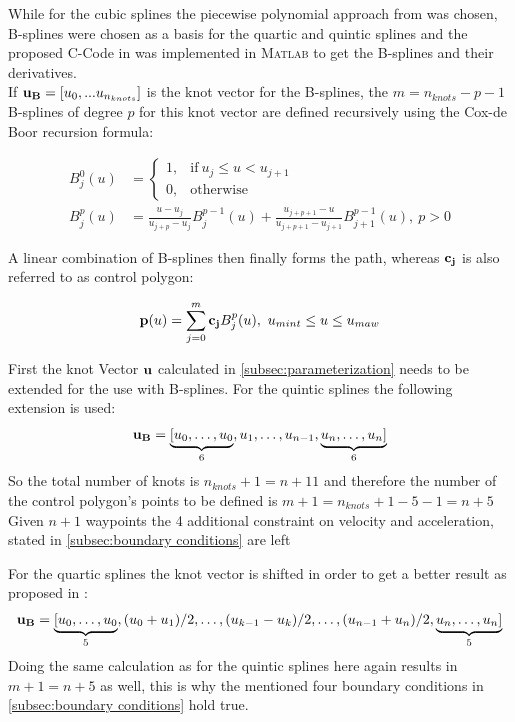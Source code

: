 While for the cubic splines the piecewise polynomial approach from \cite{engeln} was chosen, B-splines were chosen as a basis for the quartic and quintic splines and the proposed C-Code in \cite{biagiotti} was implemented in \textsc{Matlab} to get the B-splines and their derivatives.\\

If ${\bf u_B}=\left[u_0,...u_{n_{knots}}\right]$ is the knot vector for the B-splines, the $m=n_{knots}-p-1$ B-splines of degree $p$ for this knot vector are defined recursively using the Cox-de Boor recursion formula:

\begin{align}
B_j^0(u) &= \begin{cases} 1,&\text{if}~ u_j \leq u < u_{j+1}\\
					0,&\text{otherwise}
		\end{cases}\\
B_j^p(u) &= \frac{u-u_j}{u_{j+p}-u_j}B_j^{p-1}(u)+\frac{u_{j+p+1}-u}{u_{j+p+1}-u_{j+1}}B_{j+1}^{p-1}(u), ~p>0
\end{align}

A linear combination of B-splines then finally forms the path, whereas ${\bf c_j}$ is also referred to as control polygon:

\begin{equation}
{\bf p}(u) = \sum_{j=0}^m {\bf c_j}B_j^p(u), ~u_{mint} \leq u \leq u_{maw}
\end{equation}
 
First the knot Vector ${\bf u}$ calculated in \ref{subsec:parameterization} needs to be extended for the use with B-splines. For the quintic splines the following extension is used:
\begin{equation}
{\bf u_B}= \underbrace{ [u_0,\ldots,u_0}_{6},u_1, \ldots,u_{n-1},\underbrace{u_n,\ldots, u_n ]}_{6} 
\end{equation}
So the total number of knots is $n_{knots}+1 = n+11$ and therefore the number of the control polygon's points to be defined is $m+1=n_{knots}+1-5-1=n+5$ Given $n+1$ waypoints the 4 additional constraint on velocity and acceleration, stated in \ref{subsec:boundary conditions} are left

For the quartic splines the knot vector is shifted in order to get a better result as proposed in \cite{engeln}:
\begin{equation}
{\bf u_B}= \underbrace{ [u_0,\ldots,u_0}_{5},(u_0+u_1)/2, \ldots, (u_{k-1}-u_k)/2, \ldots,(u_{n-1}+u_n)/2,\underbrace{u_n,\ldots, u_n ]}_{5} 
\end{equation} 
Doing the same calculation as for the quintic splines here again results in $m+1=n+5$ as well, this is why the mentioned four boundary conditions in \ref{subsec:boundary conditions} hold true.

